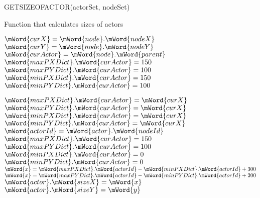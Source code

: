 GETSIZEOFACTOR(actorSet, nodeSet)
\begin{algorithm}
  \caption{Function that calculates sizes of actors}
  \begin{algorithmic}[1]
  \Statex
  	\State $\mWord{curX} = \mWord{node}.\mWord{nodeX}$
  	\State $\mWord{curY} = \mWord{node}.\mWord{nodeY}$
  	\State $\mWord{curActor} = \mWord{node}.\mWord{parent}$
        	\State $\mWord{maxPXDict}.\mWord{curActor} = 150$
        \EndIf
        	\State $\mWord{maxPYDict}.\mWord{curActor} = 100$
        \EndIf
        	\State $\mWord{minPXDict}.\mWord{curActor} = 150$
        \EndIf
        	\State $\mWord{minPYDict}.\mWord{curActor} = 100$
        \EndIf

        	\State $\mWord{maxPXDict}.\mWord{curActor} = \mWord{curX}$
        \EndIf
        	\State $\mWord{maxPYDict}.\mWord{curActor} = \mWord{curX}$
        \EndIf
        	\State $\mWord{minPXDict}.\mWord{curActor} = \mWord{curX}$
        \EndIf
        	\State $\mWord{minPYDict}.\mWord{curActor} = \mWord{curX}$
        \EndIf
  \EndFor
  \State$\mWord{actorId} = \mWord{actor}.\mWord{nodeId}$
      \State $\mWord{maxPXDict}.\mWord{curActor} = 150$
    \EndIf
      \State $\mWord{maxPYDict}.\mWord{curActor} = 100$
    \EndIf
      \State $\mWord{minPXDict}.\mWord{curActor} = 0$
    \EndIf
      \State $\mWord{minPYDict}.\mWord{curActor} = 0$
    \EndIf
    \State$\mWord{x} = \mWord{maxPXDict}.\mWord{actorId} - \mWord{minPXDict}.\mWord{actorId} + 300$
    \State$\mWord{x} = \mWord{maxPYDict}.\mWord{actorId} - \mWord{minPYDict}.\mWord{actorId} + 200$
    \State$\mWord{actor}.\mWord{sizeX} = \mWord{x}$
    \State$\mWord{actor}.\mWord{sizeY} = \mWord{y}$
  \EndFor
  \EndFunction
  \end{algorithmic}


\end{algorithm}
